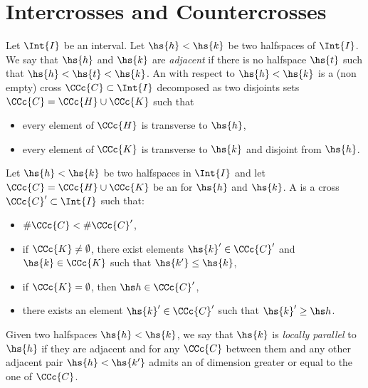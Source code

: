\section{Intercrosses and Countercrosses}


Let $\Int{I}$ be an interval. Let $\hs{h}<\hs{k}$ be two halfspaces of $\Int{I}$. 
We say that $\hs{h}$ and $\hs{k}$ are \emph{adjacent} if there is no halfspace $\hs{t}$ such that $\hs{h}<\hs{t}<\hs{k}$. An \emph{\intc} with respect to $\hs{h}<\hs{k}$ is a (non empty) cross $\CCc{C} \subset \Int{I}$ decomposed as two disjoints sets $\CCc{C} = \CCc{H} \cup \CCc{K}$ such that
\begin{itemize}
\item  every element of $\CCc{H}$ is transverse to $\hs{h}$,
\item  every element of $\CCc{K}$ is transverse to $\hs{k}$ and disjoint from $\hs{h}$.
\end{itemize}


Let $\hs{h}<\hs{k}$ be two halfspaces in $\Int{I}$ and let $\CCc{C} = \CCc{H} \cup \CCc{K}$ be an \intc for $\hs{h}$ and $\hs{k}$. A \emph{\countc} is a cross $\CCc{C}' \subset \Int{I}$ such that:
\begin{itemize}
\item $\# \CCc{C} < \# \CCc{C}'$,
\item if $\CCc{K} \neq \emptyset$, there exist elements $\hs{k}'\in\CCc{C}'$ and $\hs{k}\in\CCc{K}$ such that $\hs{k'}\le\hs{k}$,
\item if $\CCc{K} = \emptyset$, then $\hs h\in\CCc{C}'$,
\item there exists an element $\hs{k}'\in\CCc{C}'$ such that $\hs{k}'\ge\hs h$.
\end{itemize}





Given two halfspaces $\hs{h}<\hs{k}$, we say that $\hs{k}$ is \emph{locally parallel} to $\hs{h}$ if they are adjacent and for any \intc $\CCc{C}$ between them and any other adjacent pair $\hs{h}<\hs{k'}$ admits an \intc of dimension greater or equal to the one of $\CCc{C}$.



